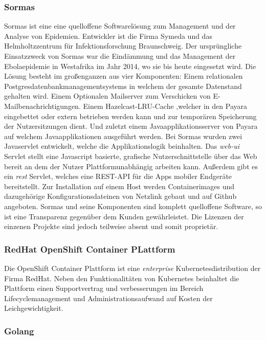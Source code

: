 \documentclass[a4paper,11pt]{article}
\begin{document}
      \subsubsection{Sormas}
      Sormas ist eine eine quelloffene Softwarelösung zum Management und der Analyse von Epidemien.
      Entwickler ist die Firma Symeda und das Helmholtzzentrum für Infektionsforschung Braunschweig.
      Der ursprüngliche Einsatzzweck von Sormas war die Eindämmung und das Management der 
      Ebolaepidemie in Westafrika im Jahr 2014, wo sie bis heute eingesetzt wird.
      \newline Die Lösung besteht im großenganzen aus vier Komponenten: Einem relationalen 
      Postgresdatenbankmanagementsystems in welchem der gesamte Datenstand gehalten wird. Einem 
      Optionalen Mailserver zum Verschicken von E-Mailbenachrichtigungen. Einem Hazelcast-LRU-Cache
      ,welcher in den Payara eingebettet oder extern betrieben werden kann und zur temporären Speicherung
      der Nutzersitzungen dient. Und zuletzt einem Javaapplikationsserver von Payara auf welchem Javaapplikationen 
      ausgeführt werden. Bei Sormas wurden zwei Javaservlet entwickelt, welche die Applikationslogik beinhalten.
      Das \textit{web-ui} Servlet stellt eine Javascript basierte, grafische Nutzerschnittstelle  über das Web 
      bereit an dem der Nutzer Plattformunabhängig arbeiten kann. Außerdem gibt es ein \textit{rest} Servlet, welches
      eine REST-API für die Apps mobiler Endgeräte bereitstellt. Zur Installation auf einem Host werden 
      Containerimages und dazugehörige Konfigurationsdateinen von Netzlink gebaut und auf Github angeboten.
      Sormas und seine Komponenten sind komplett quelloffene Software, so ist eine Transparenz gegenüber dem
      Kunden gewährleistet. Die Lizenzen der einzenen Projekte sind jedoch teilweise absent und somit proprietär.
      \subsubsection{RedHat OpenShift Container PLattform}
      Die OpenShift Container Plattform ist eine \textit{enterprise} Kubernetesdistribution der Firma RedHat. Neben den
      Funktionalitäten von Kubernetes beinhaltet die Plattform einen Supportvertrag und verbesserungen im Bereich 
      Lifecyclemanagement und Administrationsaufwand auf Kosten der Leichgewichtigkeit.   
      \subsubsection{Golang}
\end{document}
